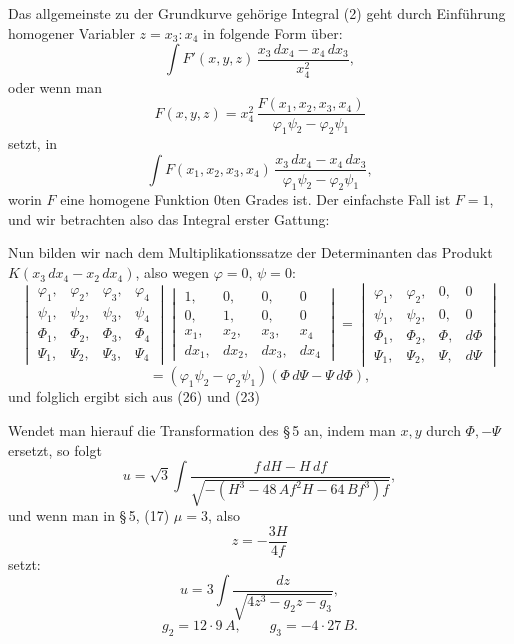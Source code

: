 Das allgemeinste zu der Grundkurve gehörige Integral (2) geht durch
Einführung homogener Variabler $z = x_3 : x_4$ in folgende Form über:
\[
\int F'(x,y,z)\,\frac{x_3\,dx_4 - x_4\,dx_3}{x_4^2},
\]
oder wenn man
\[
F(x,y,z) = x_4^2\,\frac{F(x_1,x_2,x_3,x_4)}{\varphi_1\psi_2 - \varphi_2\psi_1}
\]
setzt, in
\[
\int F(x_1,x_2,x_3,x_4)\,\frac{x_3\,dx_4 - x_4\,dx_3}{\varphi_1\psi_2 - \varphi_2\psi_1},
\]
worin $F$ eine homogene Funktion 0ten Grades ist. Der einfachste Fall ist
$F=1$, und wir betrachten also das Integral erster Gattung:

Nun bilden wir nach dem Multiplikationssatze der Determinanten das
Produkt $K(x_3\,dx_4 - x_2\,dx_4)$, %
also wegen $\varphi=0$, $\psi=0$:
\[
\begin{vmatrix}
\varphi_1, & \varphi_2, & \varphi_3, & \varphi_4 \\
\psi_1, & \psi_2, & \psi_3, & \psi_4 \\
\varPhi_1, & \varPhi_2, & \varPhi_3, & \varPhi_4 \\
\varPsi_1, & \varPsi_2, & \varPsi_3, & \varPsi_4
\end{vmatrix}
\begin{vmatrix}
1, & 0, & 0, & 0 \\
0, & 1, & 0, & 0 \\
x_1, & x_2, & x_3, & x_4 \\
dx_1, & dx_2, & dx_3, & dx_4
\end{vmatrix}
=
\begin{vmatrix}
\varphi_1, & \varphi_2, & 0, & 0 \\
\psi_1, & \psi_2, & 0, & 0 \\
\varPhi_1, & \varPhi_2, & \varPhi, & d\varPhi \\
\varPsi_1, & \varPsi_2, & \varPsi, & d\varPsi
\end{vmatrix}
\]
\[
= (\varphi_1\psi_2 - \varphi_2\psi_1)(\varPhi\,d\varPsi - \varPsi\,d\varPhi),
\]
und folglich ergibt sich aus (26) und (23)

Wendet man hierauf die Transformation des \S\,5 an, indem man $x,y$
durch $\varPhi, -\varPsi$ ersetzt, so folgt
\[
u = \sqrt{3}\int \frac{f\,dH - H\,df}{\sqrt{-(H^3 - 48\,Af^2H - 64\,Bf^3)f}},
\]
und wenn man in \S\,5, (17) $\mu = 3$, also
\[
z = -\frac{3H}{4f}
\]
setzt:
\[
u = 3\int \frac{dz}{\sqrt{4z^3 - g_2 z - g_3}},
\]
\[
g_2 = 12\cdot 9\,A, \qquad g_3 = -4\cdot 27\,B.
\]
